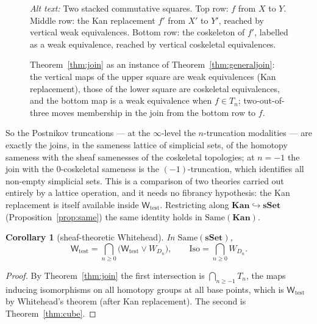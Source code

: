 \documentclass[11pt]{amsart}
\newtheorem{cor}[thm]{Corollary}
\theoremstyle{definition}
\newcommand{\Same}{\mathrm{Same}}
\newcommand{\Iso}{\mathrm{Iso}}
\newcommand{\cosk}{\mathrm{cosk}}
\newcommand{\Wtest}{\mathsf{W}_{\mathrm{test}}}
\newcommand{\sset}{\mathbf{sSet}}
\newcommand{\Kan}{\mathbf{Kan}}
\begin{document}
\begin{figure}[ht]
\centering
{}
\caption{Theorem~\ref{thm:join} as an instance of
Theorem~\ref{thm:generaljoin}: the vertical maps of the upper square are
weak equivalences (Kan replacement), those of the lower square are
coskeletal equivalences, and the bottom map is a weak equivalence when
$f\in T_n$; two-out-of-three moves membership in the join from the bottom row
to $f$.}
\label{fig:join}
\par\smallskip\noindent\textit{Alt text:} Two stacked commutative squares.
Top row: $f$ from $X$ to $Y$. Middle row: the Kan replacement $f'$ from $X'$
to $Y'$, reached by vertical weak equivalences. Bottom row: the coskeleton of
$f'$, labelled as a weak equivalence, reached by vertical coskeletal
equivalences.
\end{figure}

So the Postnikov truncations --- at the $\infty$-level the $n$-truncation
modalities --- are exactly the joins, in the sameness lattice of simplicial
sets, of the homotopy sameness with the sheaf samenesses of the coskeletal
topologies; at $n=-1$ the join with the $0$-coskeletal sameness is the
$(-1)$-truncation, which identifies all non-empty simplicial sets. This is a
comparison of two theories carried out entirely by a lattice operation, and
it needs no fibrancy hypothesis: the Kan replacement is itself available
inside $\Wtest$. Restricting along $\Kan\hookrightarrow\sset$
(Proposition~\ref{prop:same}) the same identity holds in $\Same(\Kan)$.

\begin{cor}[sheaf-theoretic Whitehead]\label{cor:whitehead}
In $\Same(\sset)$,
\[
\Wtest=\bigcap_{n\ge0}\bigl(\Wtest\vee W_{D_n}\bigr),\qquad
\Iso=\bigcap_{n\ge0}W_{D_n}.
\]
\end{cor}
\begin{proof}
By Theorem~\ref{thm:join} the first intersection is $\bigcap_{n\ge-1}T_n$,
the maps inducing isomorphisms on all homotopy groups at all base points,
which is $\Wtest$ by Whitehead's theorem (after Kan replacement). The second
is Theorem~\ref{thm:cube}.
\end{proof}
\end{document}
